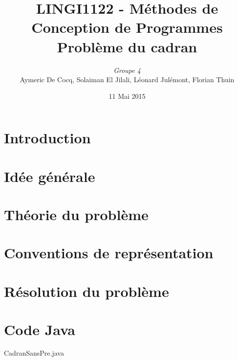 \documentclass[11pt,a4paper]{article}
\author{\textit{Groupe 4}\\
Aymeric De Cocq, Solaiman El Jilali, Léonard Julémont, Florian Thuin}
\title{LINGI1122 - Méthodes de Conception de Programmes\\
Problème du cadran}
\date{11 Mai 2015}
\begin{document}
\maketitle

\section* {Introduction}


\section{Idée générale}


 
\section{Théorie du problème}


\section{Conventions de représentation}


\section{Résolution du problème}





\section{Code Java}
 {CadranSansPre.java}
\end{document}
